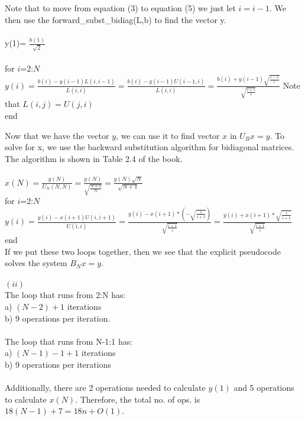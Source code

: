 \documentclass{article}
\DeclareMathOperator{\1}{\mathit{1}}
\numberwithin{figure}{section} %
\numberwithin{table}{section}
\begin{document}
Note that to move from equation (3) to equation (5) we just let \(i=i-1\).
We then use the forward\_subst\_bidiag(L,b) to find the vector y.\\\\
\indent y(1)= \(\frac{b(1)}{\sqrt{2}}\) \\\\
\indent for \(i\)=2:\(N\) \\
\indent \hspace{1 cm} \(y(i)= \frac{b(i)-y(i-1)L(i,i-1)}{L(i,i)} = \frac{b(i)-y(i-1)U(i-1,i)}{L(i,i)} = \frac{b(i)+y(i-1) \sqrt{\frac{i-1}{i}}}{\sqrt{\frac{i+i}{i}}}\) \indent Note that \(L(i,j)=U(j,i)\)\\ 
\indent end \\
\par Now that we have the vector \(y\), we can use it to find vector \(x\) in \(U_Bx=y\). To solve for x, we use the backward substitution algorithm for bidiagonal matrices. The algorithm is shown in Table 2.4 of the book.\\\\
\indent \( x(N)=\frac{y(N)}{U_N(N,N)} = \frac{y(N)}{\sqrt{\frac{N+1}{N}}} = \frac{y(N)\sqrt{N}}{\sqrt{N+1}} \)\\
\indent for \(i\)=2:\(N\) \\
\indent \hspace{1 cm} \(y(i) = \frac{y(i)-x(i+1)U(i,i+1)}{U(i,i)} = \frac{y(i)-x(i+1)*(-\sqrt{\frac{i}{i+1}})}{\sqrt{\frac{i+1}{i}}} = \frac{y(i)+x(i+1)*\sqrt{\frac{i}{i+1}}}{\sqrt{\frac{i+1}{i}}}\) \\
\indent end \\
If we put these two loops together, then we see that the explicit pseudocode solves the system \(B_Nx=y\).\\\\
\((ii)\) \\
The loop that runs from 2:N has:\\
\indent a) \((N-2)+1\) iterations\\ 
\indent b) 9 operations per iteration.\\\\
The loop that runs from N-1:1 has:\\
\indent a) \((N-1)-1+1\) iterations\\
\indent b) 9 operations per iterations\\\\
Additionally, there are 2 operations needed to calculate \(y(1)\) and 5 operations to calculate \(x(N)\). Therefore, the total no. of ops. is \(18(N-1) + 7 = 18n +O(1)\).\\
\end{document}

